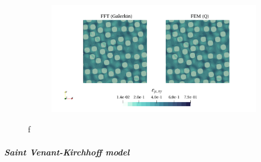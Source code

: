 \begin{figure}[hbt]
\begin{subfigure}[b]{0.49\textwidth}
    \caption{}
    \label{subfig:hencky_2D_shear_cpu_time_vs_n_voxels}
  \end{subfigure}
  \begin{subfigure}[b]{\textwidth}
    \centering
    \includegraphics[width=\textwidth]{figures/hencky_2D_shear_strain_12}
    \caption{}
    \label{subfig:hencky_2D_shear_strain_12}
  \end{subfigure}
  \caption{f}
\label{fig:hencky_2D_shear}
\end{figure}

\begin{figure}[hbt] %
\label{fig:hencky_mat_res_2D_normal}
\end{figure}

\begin{figure}[hbt] %
\label{fig:hencky_mat_res_2D_shear}
\end{figure}


\begin{figure}[hbt] %
\label{fig:hencky_mat_res_3D_normal}
\end{figure}

\begin{figure}[hbt] %
\label{fig:hencky_mat_res_3D_shear}
\end{figure}

\FloatBarrier

\subparagraph{Saint Venant-Kirchhoff model}

